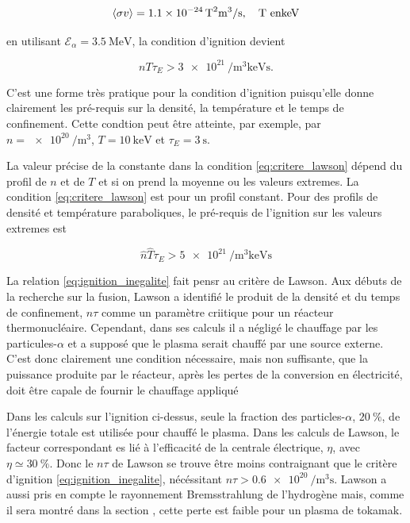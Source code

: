 \documentclass[main.tex]{subfiles}
\begin{document}
\begin{equation}
	\left\langle \sigma v \right\rangle = \SI{1.1e-24}{\text{T}\squared \meter\cubed\per\second}, \quad \text{T en} \SI{}{\kilo\electronvolt}
	\label{eq:sigma_v_constant} 
\end{equation}

en utilisant \( \mathscr{E}_\alpha = \SI{3.5}{\mega\electronvolt} \), la condition d'ignition devient

\begin{equation}
	n T \tau_E > \SI{3e21}{\per\meter\cubed\kilo\electronvolt\second}.
	\label{eq:critere_lawson}
\end{equation}

C'est une forme très pratique pour la condition d'ignition puisqu'elle donne clairement les pré-requis sur la densité, la température et le temps de confinement.
Cette condtion peut être atteinte, par exemple, par \( n = \SI{e20}{\per\meter\cubed} \), \( T = \SI{10}{\kilo\electronvolt} \) et \( \tau_E = \SI{3}{\second} \).

La valeur précise de la constante dans la condition \ref{eq:critere_lawson} dépend du profil de \( n \) et de \( T \) et si on prend la moyenne ou les valeurs extremes.
La condition \ref{eq:critere_lawson} est pour un profil constant.
Pour des profils de densité et température paraboliques, le pré-requis de l'ignition sur les valeurs extremes est

\begin{equation}
	\hat{n}\hat{T} \tau_E > \SI{5e21}{\per\meter\cubed\kilo\electronvolt\second}
	\label{eq:critere_lawson_peak}
\end{equation}

La relation \ref{eq:ignition_inegalite} fait pensr au critère de Lawson.
Aux débuts de la recherche sur la fusion, Lawson a identifié le produit de la densité et du temps de confinement, \( n \tau \) comme un paramètre criitique pour un réacteur thermonucléaire.
Cependant, dans ses calculs il a négligé le chauffage par les particules-\( \alpha \) et a supposé que le plasma serait chauffé par une source externe.
C'est donc clairement une condition nécessaire, mais non suffisante, que la puissance produite par le réacteur, après les pertes de la conversion en électricité, doit être capale de fournir le chauffage appliqué

Dans les calculs sur l'ignition ci-dessus, seule la fraction des particles-\( \alpha \), \( \SI{20}{\percent} \), de l'énergie totale est utilisée pour chauffé le plasma.
Dans les calculs de Lawson, le facteur correspondant es lié à l'efficacité de la centrale électrique, \( \eta \), avec \( \eta  \simeq \SI{30}{\percent} \).
Donc le \( n \tau \) de Lawson se trouve être moins contraignant que le critère d'ignition \ref{eq:ignition_inegalite}, nécéssitant \( n \tau > \SI{0.6e20}{\per\meter\cubed\second} \).
Lawson a aussi pris en compte le rayonnement Bremsstrahlung de l'hydrogène mais, comme il sera montré dans la section \color{red}{Section 4.24 (lien à rajouter quand elle sera faite)}\color{black}, cette perte est faible pour un plasma de tokamak.
\end{document}
